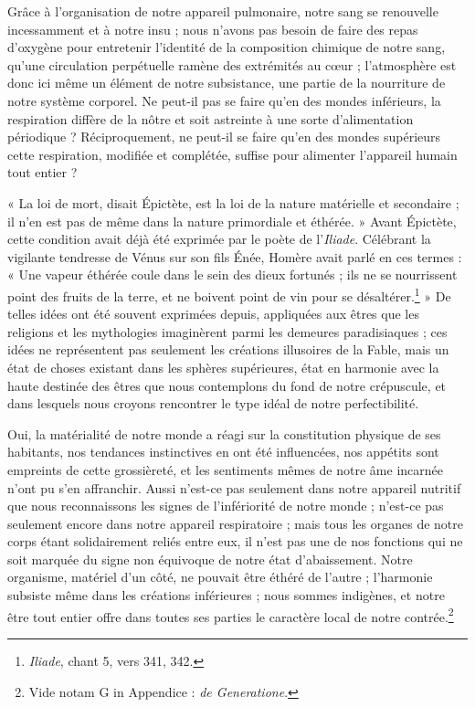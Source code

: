 \documentclass[a4paper, 11pt, oneside, landscape]{article}
\begin{document}
Grâce à l'organisation de notre appareil pulmonaire, notre sang se renouvelle incessamment et à notre insu ; nous n'avons pas besoin de faire des repas d'oxygène pour entretenir l'identité de la composition chimique de notre sang, qu'une circulation perpétuelle ramène des extrémités au cœur ; l'atmosphère est donc ici même un élément de notre subsistance, une partie de la nourriture de notre système corporel. Ne peut-il pas se faire qu'en des mondes inférieurs, la respiration diffère de la nôtre et soit astreinte à une sorte d'alimentation périodique ? Réciproquement, ne peut-il se faire qu'en des mondes supérieurs cette respiration, modifiée et complétée, suffise pour alimenter l'appareil humain tout entier ?

« La loi de mort, disait Épictète, est la loi de la nature matérielle et secondaire ; il n'en est pas de même dans la nature primordiale et éthérée. » Avant Épictète, cette condition avait déjà été exprimée par le poète de l'\emph{Iliade}. Célébrant la vigilante tendresse de Vénus sur son fils Énée, Homère avait parlé en ces termes : « Une vapeur éthérée coule dans le sein des dieux fortunés ; ils ne se nourrissent point des fruits de la terre, et ne boivent point de vin pour se désaltérer.\footnote{\emph{Iliade}, chant 5, vers 341, 342.} » De telles idées ont été souvent exprimées depuis, appliquées aux êtres que les religions et les mythologies imaginèrent parmi les demeures paradisiaques ; ces idées ne représentent pas seulement les créations illusoires de la Fable, mais un état de choses existant dans les sphères supérieures, état en harmonie avec la haute destinée des êtres que nous contemplons du fond de notre crépuscule, et dans lesquels nous croyons rencontrer le type idéal de notre perfectibilité.

Oui, la matérialité de notre monde a réagi sur la constitution physique de ses habitants, nos tendances instinctives en ont été influencées, nos appétits sont empreints de cette grossièreté, et les sentiments mêmes de notre âme incarnée n'ont pu s'en affranchir. Aussi n'est-ce pas seulement dans notre appareil nutritif que nous reconnaissons les signes de l'infériorité de notre monde ; n'est-ce pas seulement encore dans notre appareil respiratoire ; mais tous les organes de notre corps étant solidairement reliés entre eux, il n'est pas une de nos fonctions qui ne soit marquée du signe non équivoque de notre état d'abaissement. Notre organisme, matériel d'un côté, ne pouvait être éthéré de l'autre ; l'harmonie subsiste même dans les créations inférieures ; nous sommes indigènes, et notre être tout entier offre dans toutes ses parties le caractère local de notre contrée.\footnote{Vide notam G in Appendice : \emph{de Generatione}.}
\end{document}

